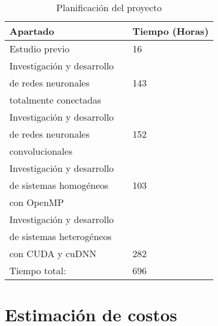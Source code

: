 \begin{table}[H]
	\centering
	\begin{tabular}{|lll|}
		\hline
		Apartado 	 &\vline  & Tiempo (Horas) \\
		\hline
		
		Estudio previo    & \vline & 16 \\			
		\hline
		Investigación y desarrollo  	 & \vline & 	\\
		de redes neuronales  	 & \vline & 143	\\
		totalmente conectadas 	 & \vline & 	\\
		\hline
		Investigación y desarrollo    & \vline & 	 \\	
		de redes neuronales    & \vline & 152	 \\			
		convolucionales    & \vline & 	 \\					
		\hline
		Investigación y desarrollo  	 & \vline & 	 \\
		de sistemas homogéneos  	 & \vline & 103	 \\
		con OpenMP 	 & \vline & 	 \\
		\hline
		Investigación y desarrollo     & \vline &  	\\
		de sistemas heterogéneos    & \vline &  \\ 
		con CUDA y cuDNN    & \vline & 282 \\ 	
		\hline
		\hline
		Tiempo total:				& \vline & 696 \\
		\hline
	\end{tabular}
	\caption{Planificación del proyecto}
	\label{tabla_planificación}
\end{table}

\section{Estimación de costos}